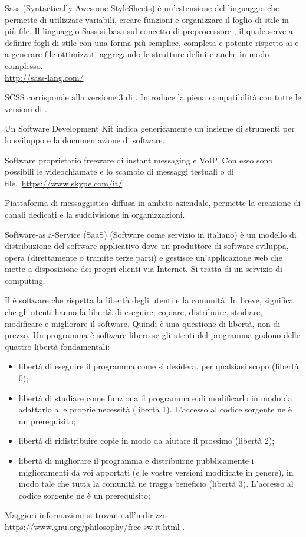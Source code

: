 Sass (Syntactically Awesome StyleSheets) è un'estensione del linguaggio  che permette di utilizzare variabili, creare funzioni e organizzare il foglio di stile in più file. Il linguaggio Sass si basa sul concetto di preprocessore , il quale serve a definire fogli di stile con una forma più semplice, completa e potente rispetto ai  e a generare file  ottimizzati aggregando le strutture definite anche in modo complesso.\\
\url{http://sass-lang.com/}

SCSS corrisponde alla versione 3 di . Introduce la piena compatibilità con tutte le versioni di .

Un Software Development Kit indica genericamente un insieme di strumenti per lo sviluppo e la documentazione di software.

Software proprietario freeware di instant messaging e VoIP. Con esso sono possibili le videochiamate e lo scambio di messaggi testuali o di file.\
\url{https://www.skype.com/it/}

Piattaforma di messaggistica diffusa in ambito aziendale, permette la creazione di canali dedicati e la suddivisione in organizzazioni. 

Software-as.a-Service (SaaS) (Software come servizio in italiano) è un modello di distribuzione del software applicativo dove un produttore di software sviluppa, opera (direttamente o tramite terze parti) e gestisce un'applicazione web che mette a disposizione dei propri clienti via Internet. Si tratta di un servizio di  computing.

Il  è software che rispetta la libertà degli utenti e la comunità. In breve, significa che gli utenti hanno la libertà di eseguire, copiare, distribuire, studiare, modificare e migliorare il software. Quindi è una questione di libertà, non di prezzo.
Un programma è software libero se gli utenti del programma godono delle quattro libertà fondamentali:
\begin{itemize}
    \item libertà di eseguire il programma come si desidera, per qualsiasi scopo (libertà 0);
    \item libertà di studiare come funziona il programma e di modificarlo in modo da adattarlo alle proprie necessità (libertà 1). L'accesso al codice sorgente ne è un prerequisito;
    \item libertà di ridistribuire copie in modo da aiutare il prossimo (libertà 2);
    \item libertà di migliorare il programma e distribuirne pubblicamente i miglioramenti da voi apportati (e le vostre versioni modificate in genere), in modo tale che tutta la comunità ne tragga beneficio (libertà 3). L'accesso al codice sorgente ne è un prerequisito;
\end{itemize}
Maggiori informazioni si trovano all'indirizzo \url{https://www.gnu.org/philosophy/free-sw.it.html} .

